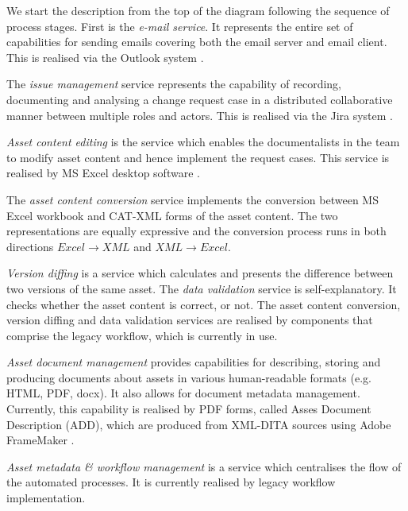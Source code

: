 
	We start the description from the top of the diagram following the sequence of process stages. First is the \textit{e-mail service}. It represents the entire set of capabilities for sending emails covering both the email server and email client. This is realised via the Outlook system \citep{outlook}. 
	
	The \textit{issue management} service represents the capability of recording, documenting and analysing a change request case in a distributed collaborative manner between multiple roles and actors. This is realised via the Jira system \citep{jira}. 
	
	\textit{Asset content editing} is the service which enables the documentalists in the team to modify asset content and hence implement the request cases. This service is realised by MS Excel desktop software \citep{excel}.
	
	The \textit{asset content conversion} service implements the conversion between MS Excel workbook and CAT-XML forms of the asset content. The two representations are equally expressive and the conversion process runs in both directions $ Excel \rightarrow XML $ and $XML \rightarrow Excel $.
	
	\textit{Version diffing} is a service which calculates and presents the difference between two versions of the same asset. The \textit{data validation} service is self-explanatory. It checks whether the asset content is correct, or not. The asset content conversion, version diffing and data validation services are realised by components that comprise the legacy workflow, which is currently in use.
	
	\textit{Asset document management} provides capabilities for describing, storing and producing documents about assets in various human-readable formats (e.g. HTML, PDF, docx). It also allows for document metadata management. Currently, this capability is realised by PDF forms, called Asses Document Description (ADD), which are produced from XML-DITA sources \citep{dita-day2005introduction, dita-spec} using Adobe FrameMaker \citep{framemaker} . 
	
	\textit{Asset metadata \& workflow management} is a service which centralises the flow of the automated processes. It is currently realised by legacy workflow implementation. 
	
